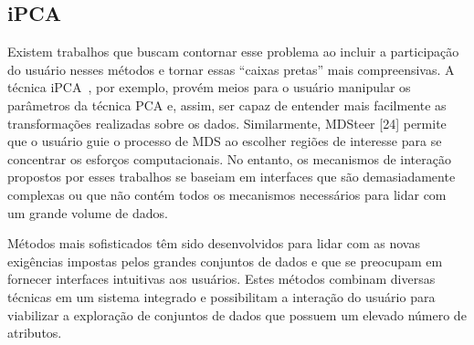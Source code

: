 \subsection{iPCA}

Existem trabalhos que buscam contornar esse problema ao incluir a participação do usuário nesses métodos e tornar essas ``caixas pretas'' mais compreensivas. A técnica iPCA~\cite{Jeong2009}, por exemplo, provém meios para o usuário manipular os parâmetros da técnica PCA e, assim, ser capaz de entender mais facilmente as transformações realizadas sobre os dados. Similarmente, MDSteer [24] permite que o usuário guie o processo de MDS ao escolher regiões de interesse para se concentrar os esforços computacionais. No entanto, os mecanismos de interação propostos por esses trabalhos se baseiam em interfaces que são demasiadamente complexas ou que não contém todos os mecanismos necessários para lidar com um grande volume de dados.

Métodos mais sofisticados têm sido desenvolvidos para lidar com as novas exigências impostas pelos grandes conjuntos de dados e que se preocupam em fornecer interfaces intuitivas aos usuários. Estes métodos combinam diversas técnicas em um sistema integrado e possibilitam a interação do usuário para viabilizar a exploração de conjuntos de dados que possuem um elevado número de atributos.
